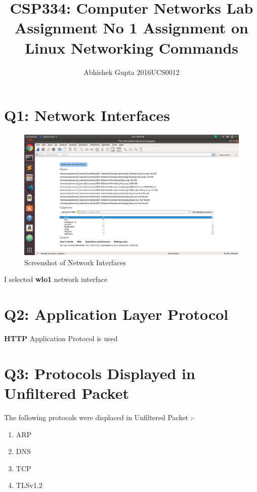 \documentclass{article}
\title{CSP334: Computer Networks \linebreak
Lab Assignment No 1 \linebreak
Assignment on Linux Networking Commands}
\author{Abhishek Gupta  2016UCS0012}
\begin{document}
\maketitle

\section{Q1: Network Interfaces}
 \begin{figure}[H]
 \centering
 \includegraphics[width=1.0\textwidth]{../q1/a.png}
 \caption{\label{fig:PING}Screenshot of Network Interfaces}
 \end{figure}
 
 I selected \textbf{wlo1} network interface
 
 
\section{Q2: Application Layer Protocol}

\textbf{HTTP} Application Protocol is used
 
\section{Q3: Protocols Displayed in Unfiltered Packet}

The following protocols were displaced in Unfiltered Packet :-
\begin{enumerate}
	\item ARP
	\item DNS
	\item TCP
	\item TLSv1.2
\end{enumerate}
 
\end{document}
